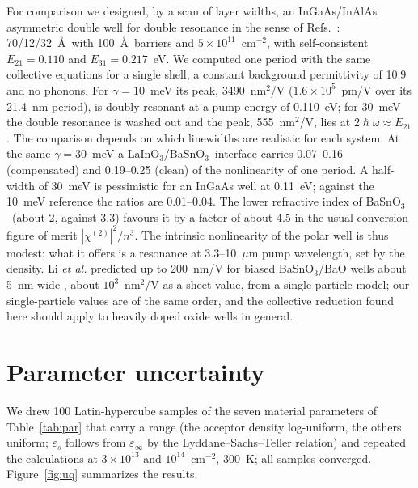 \documentclass[11pt]{article}
\newcommand{\LIO}{\texorpdfstring{LaInO$_3$}{LaInO3}}
\newcommand{\BSO}{\texorpdfstring{BaSnO$_3$}{BaSnO3}}
\begin{document}
For comparison we designed, by a scan of layer widths, an InGaAs/InAlAs asymmetric double well for double resonance in the sense of Refs.~\cite{RosencherBois1991,Vurgaftman1996SSC}: 70/12/32~\AA\ with 100~\AA\ barriers and $5\times10^{11}$~cm$^{-2}$, with self-consistent $E_{21}=0.110$ and $E_{31}=0.217$~eV. We computed one period with the same collective equations for a single shell, a constant background permittivity of 10.9 and no phonons. For $\gamma=10$~meV its peak, 3490~nm$^2$/V ($1.6\times10^5$~pm/V over its 21.4~nm period), is doubly resonant at a pump energy of 0.110~eV; for 30~meV the double resonance is washed out and the peak, 555~nm$^2$/V, lies at $2\hslash\omega\approx E_{21}$. The comparison depends on which linewidths are realistic for each system. At the same $\gamma=30$~meV a \LIO/\BSO\ interface carries 0.07--0.16 (compensated) and 0.19--0.25 (clean) of the nonlinearity of one period. A half-width of 30~meV is pessimistic for an InGaAs well at 0.11~eV; against the 10~meV reference the ratios are 0.01--0.04. The lower refractive index of \BSO\ (about 2, against 3.3) favours it by a factor of about 4.5 in the usual conversion figure of merit $|\chi^{(2)}|^2/n^3$. The intrinsic nonlinearity of the polar well is thus modest; what it offers is a resonance at 3.3--10~$\mu$m pump wavelength, set by the density. Li \emph{et al.} predicted up to 200~nm/V for biased \BSO/BaO wells about 5~nm wide \cite{Li2021BSO}, about $10^{3}$~nm$^2$/V as a sheet value, from a single-particle model; our single-particle values are of the same order, and the collective reduction found here should apply to heavily doped oxide wells in general.

\section{Parameter uncertainty}\label{sec:uq}
We drew 100 Latin-hypercube samples of the seven material parameters of Table~\ref{tab:par} that carry a range (the acceptor density log-uniform, the others uniform; $\varepsilon_s$ follows from $\varepsilon_\infty$ by the Lyddane--Sachs--Teller relation) and repeated the calculations at $3\times10^{13}$ and $10^{14}$~cm$^{-2}$, 300~K; all samples converged. Figure~\ref{fig:uq} summarizes the results.
\end{document}
